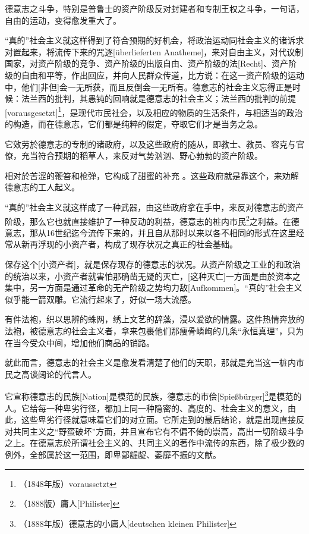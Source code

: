 \documentclass[a4paper,12pt]{ctexart}
\begin{document}
德意志之斗争，特别是普鲁士的资产阶级反对封建者和专制王权之斗争，一句话，自由的运动，变得愈发重大了。

“真的”社会主义就这样得到了符合预期的好机会，将政治运动同社会主义的诸诉求对置起来，将流传下来的咒逐[überlieferten Anatheme]，来对自由主义，对代议制国家，对资产阶级的竞争、资产阶级的出版自由、资产阶级的法[Recht]、资产阶级的自由和平等，作出回应，并向人民群众传道，比方说：在这一资产阶级的运动中，他们[非但]会一无所获，而且反倒会一无所有。德意志的社会主义忘得正是时候：法兰西的批判，其愚钝的回响就是德意志的社会主义；法兰西的批判的前提[vorausgesetzt]\footnote{（1848年版）voraussetzt}，是现代市民社会，以及相应的物质的生活条件，与相适当的政治的构造，而在德意志，它们都是纯粹的假定，夺取它们才是当务之急。


它效劳於德意志的专制的诸政府，以及这些政府的随从，即教士、教员、容克与官僚，充当符合预期的稻草人，来反对气势汹汹、野心勃勃的资产阶级。

相对於苦涩的鞭笞和枪弹，它构成了甜蜜的补充 。这些政府就是靠这个，来劝解德意志的工人起义。

“真的”社会主义就这样成了一种武器，由这些政府拿在手中，来反对德意志的资产阶级，那么它也就直接维护了一种反动的利益，德意志的桩内市民\footnote{（1888版）庸人[Philister]}之利益。在德意志，那从16世纪迄今流传下来的，并且自从那时以来以各不相同的形式在这里经常从新再浮现的小资产者，构成了现存状况之真正的社会基础。

保存这个[小资产者]，就是保存现存的德意志的状况。从资产阶级之工业的和政治的统治以来，小资产者就害怕那确凿无疑的灭亡，[这种灭亡]一方面是由於资本之集中，另一方面是通过革命的无产阶级之势均力敌[Aufkommen]。“真的”社会主义似乎能一箭双雕。它流行起来了，好似一场大流感。

有件法袍，织以思辨的蛛网，绣上文艺的辞藻，浸以爱欲的情露。这件热情奔放的法袍，被德意志的社会主义者，拿来包裹他们那瘦骨嶙峋的几条“永恒真理”，只为在当今受众中间，增加他们商品的销路。

就此而言，德意志的社会主义是愈发看清楚了他们的天职，那就是充当这一桩内市民之高谈阔论的代言人。

它宣称德意志的民族[Nation]是模范的民族，德意志的市侩[Spießbürger]\footnote{（1888年版）德意志的小庸人[deutschen kleinen Philister]}是模范的人。它给每一种卑劣行径，都加上同一种隐密的、高度的、社会主义的意义，由此，这些卑劣行径就意味着它们的对立面。它所走到的最后结论，就是出现直接反对共同主义之“野蛮破坏”方面，并且宣布它有不偏不倚的崇高，高出一切阶级斗争之上。在德意志於所谓社会主义的、共同主义的著作中流传的东西，除了极少数的例外，全部属於这一范围，即卑鄙龌龊、萎靡不振的文献。
\end{document}
